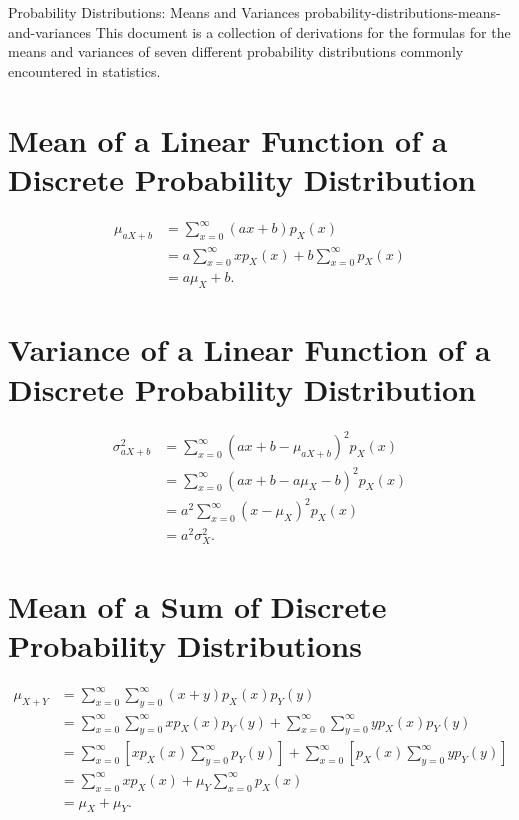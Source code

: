 \documentclass{myart}
\newcommand{\mean}{\mu}
\newcommand{\variance}{\sigma^2}
\begin{document}
\titlepage
{Probability Distributions: Means and Variances}
{probability-distributions-means-and-variances}
{This document is a collection of derivations for the formulas for the
  means and variances of seven different probability distributions
  commonly encountered in statistics.}

\section{Mean of a Linear Function of a Discrete Probability
  Distribution}

\begin{align*}
   \mean_{aX+b}
&= \sum_{x=0}^\infty (ax + b) p_X(x) \\
&= a \sum_{x=0}^\infty x p_X(x) + b \sum_{x=0}^\infty p_X(x) \\
&= a \mean_X + b.
\end{align*}

\section{Variance of a Linear Function of a Discrete Probability
  Distribution}

\begin{align*}
   \variance_{aX+b}
&= \sum_{x=0}^\infty (ax + b - \mean_{aX+b})^2 p_X(x) \\
&= \sum_{x=0}^\infty (ax + b - a \mean_X - b)^2 p_X(x) \\
&= a^2 \sum_{x=0}^\infty (x - \mean_X)^2 p_X(x) \\
&= a^2 \variance_X.
\end{align*}

\section{Mean of a Sum of Discrete Probability Distributions}

\begin{align*}
   \mean_{X+Y}
&= \sum_{x=0}^\infty \sum_{y=0}^\infty (x + y) p_X(x) p_Y(y) \\
&= \sum_{x=0}^\infty \sum_{y=0}^\infty x p_X(x) p_Y(y)
   + \sum_{x=0}^\infty \sum_{y=0}^\infty y p_X(x) p_Y(y) \\
&= \sum_{x=0}^\infty \left[x p_X(x) \sum_{y=0}^\infty p_Y(y)\right]
   + \sum_{x=0}^\infty
       \left[p_X(x) \sum_{y=0}^\infty y p_Y(y)\right] \\
&= \sum_{x=0}^\infty x p_X(x) + \mean_Y \sum_{x=0}^\infty p_X(x) \\
&= \mean_X + \mean_Y.
\end{align*}
\end{document}
